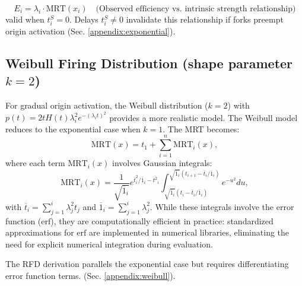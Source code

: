 \documentclass[10pt,a4paper]{revtex4-2}
\newcommand{\avgk}[1]{\overline{#1}_i}
\begin{document}
\begin{equation}\label{eq:ei_exp}
E_i = \lambda_i \cdot \text{MRT}(x_i) \quad \text{(Observed efficiency vs. intrinsic strength relationship)}
\end{equation} 
 valid when \(t_i^S = 0\). Delays \(t_i^S \neq 0\) invalidate this relationship if forks preempt origin activation (Sec. \ref{appendix:exponential}).

\subsection{Weibull Firing Distribution (shape parameter \(k=2\))}
For gradual origin activation, the Weibull distribution (\(k=2\)) with \(p(t) = 2tH(t)\lambda_i^2e^{-(\lambda_i t)^2}\) provides a more realistic model. The Weibull model reduces to the exponential case when \(k=1\). The MRT becomes:
\begin{equation}\label{eq:mrt_weibull}
\text{MRT}(x) = t_1 + \sum_{i=1}^{n} \text{MRT}_i(x),
\end{equation}
where each term \(\text{MRT}_i(x)\) involves Gaussian integrals:
\begin{equation}
\text{MRT}_i(x) = \frac{1}{\sqrt{\avgk{1}}} e^{\avgk{t}^2/\avgk{1} - \avgk{t^2}} \int_{\sqrt{\avgk{1}}(t_i - \avgk{t}/\avgk{1})}^{\sqrt{\avgk{1}}(t_{i+1} - \avgk{t}/\avgk{1})} e^{-u^2} du,
\end{equation}
with \(\avgk{t} = \sum_{j=1}^{i} \lambda_j^2 t_j\) and \(\avgk{1} = \sum_{j=1}^{i} \lambda_j^2\). While these integrals involve the error function (\(\text{erf}\)), they are computationally efficient
in practice: standardized approximations for \(\text{erf}\) are implemented in 
numerical libraries, eliminating the need for explicit numerical integration during evaluation.

The RFD derivation parallels the exponential case but requires differentiating error function terms. (Sec. \ref{appendix:weibull}).
\end{document}
